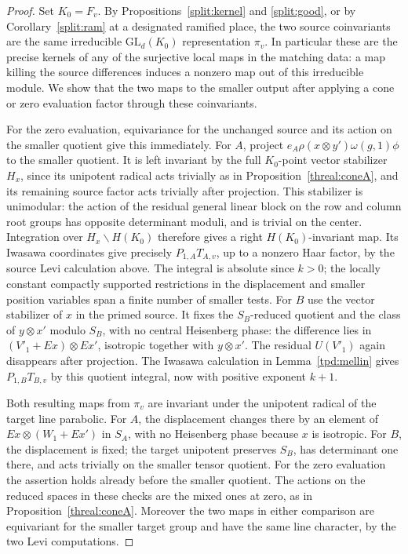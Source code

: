 \begin{proof}
Set \(K_0=F_v\). By Propositions~\ref{split:kernel} and
\ref{split:good}, or by Corollary~\ref{split:ram} at a designated
ramified place, the two source coinvariants are the same
irreducible \(\mathrm{GL}_d(K_0)\) representation \(\pi_v\).
In particular these are the precise kernels of any of the
surjective local maps in the matching data: a map killing the
source differences induces a nonzero map out of this irreducible
module. We show that the two maps to the smaller output after
applying a cone or zero evaluation factor through these
coinvariants.

For the zero evaluation, equivariance for the unchanged source
and its action on the smaller quotient give this immediately.
For \(A\), project
\(e_A\rho(x\otimes y')\omega(g,1)\phi\) to the smaller quotient.
It is left invariant by the full \(K_0\)-point vector stabilizer
\(H_x\), since its unipotent radical acts trivially as in
Proposition~\ref{threal:coneA}, and its remaining source factor
acts trivially after projection. This stabilizer is unimodular:
the action of the residual general linear block on the row and
column root groups has opposite determinant moduli, and is trivial
on the center. Integration over \(H_x\backslash H(K_0)\) therefore
gives a right \(H(K_0)\)-invariant map. Its Iwasawa coordinates
give precisely \(P_{1,A}T_{A,v}\), up to a nonzero Haar factor,
by the source Levi calculation above. The integral is absolute
since \(k>0\); the locally constant compactly supported restrictions
in the displacement and smaller position variables span a finite
number of smaller tests. For \(B\) use the vector stabilizer of
\(x\) in the primed source. It fixes the \(S_B\)-reduced quotient
and the class of \(y\otimes x'\) modulo \(S_B\), with no central
Heisenberg phase: the difference lies in
\((V'_1+Ex)\otimes Ex'\), isotropic together with
\(y\otimes x'\). The residual \(U(V'_1)\) again disappears after
projection. The Iwasawa calculation in Lemma~\ref{tpd:mellin}
gives \(P_{1,B}T_{B,v}\) by this quotient integral, now with
positive exponent \(k+1\).

Both resulting maps from \(\pi_v\) are invariant under the
unipotent radical of the target line parabolic. For \(A\), the
displacement changes there by an element of
\(Ex\otimes(W_1+Ex')\) in \(S_A\), with no Heisenberg phase
because \(x\) is isotropic. For \(B\), the displacement is fixed;
the target unipotent preserves \(S_B\), has determinant one there,
and acts trivially on the smaller tensor quotient. For the zero
evaluation the assertion holds already before the smaller quotient.
The actions on the reduced spaces in these checks are the mixed
ones at zero, as in Proposition~\ref{threal:coneA}. Moreover the
two maps in either comparison are equivariant for the smaller
target group and have the same line character, by the two Levi
computations.


\end{proof}
